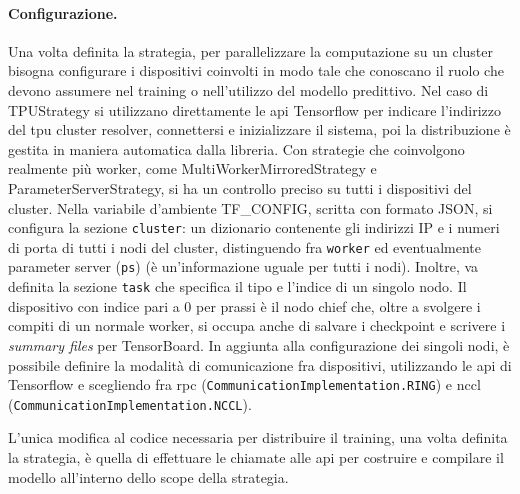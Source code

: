 \documentclass[12pt,a4paper,fleqn,titlepage]{report}
\begin{document}
        \paragraph{Configurazione.}
        Una volta definita la strategia, per parallelizzare la computazione su un \gls{cluster} bisogna configurare i dispositivi coinvolti in modo tale che conoscano il ruolo che devono assumere nel training o nell'utilizzo del modello predittivo. Nel caso di TPUStrategy si utilizzano direttamente le \gls{api} Tensorflow per indicare l'indirizzo del \gls{tpu} cluster resolver, connettersi e inizializzare il sistema, poi la distribuzione è gestita in maniera automatica dalla libreria.
        Con strategie che coinvolgono realmente più worker, come MultiWorkerMirroredStrategy e ParameterServerStrategy, si ha un controllo preciso su tutti i dispositivi del \gls{cluster}. Nella variabile d'ambiente TF\_CONFIG, scritta con formato JSON, si configura la sezione \lstinline{cluster}: un dizionario contenente gli indirizzi IP e i numeri di porta di tutti i nodi del cluster, distinguendo fra \lstinline{worker} ed eventualmente parameter server (\lstinline{ps}) (è un'informazione uguale per tutti i nodi). Inoltre, va definita la sezione \lstinline{task} che specifica il tipo e l'indice di un singolo nodo. Il dispositivo con indice pari a 0 per prassi è il nodo chief che, oltre a svolgere i compiti di un normale worker, si occupa anche di salvare i checkpoint e scrivere i \emph{summary files} per TensorBoard. In aggiunta alla configurazione dei singoli nodi, è possibile definire la modalità di comunicazione fra dispositivi, utilizzando le \gls{api} di Tensorflow e scegliendo fra \gls{rpc} (\lstinline{CommunicationImplementation.RING}) e \gls{nccl} (\lstinline{CommunicationImplementation.NCCL}).

        L'unica modifica al codice necessaria per distribuire il training, una volta definita la strategia, è quella di effettuare le chiamate alle \gls{api} per costruire e compilare il modello all'interno dello scope della strategia.
\end{document}
